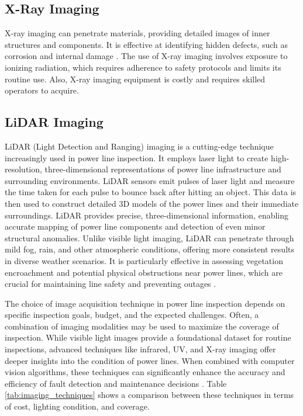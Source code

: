 \subsection{X-Ray Imaging}
X-ray imaging can penetrate materials, providing detailed images of inner structures and components. It is effective at identifying hidden defects, such as corrosion and internal damage \cite{wang_internal_2023}. The use of X-ray imaging involves exposure to ionizing radiation, which requires adherence to safety protocols and limits its routine use. Also, X-ray imaging equipment is costly and requires skilled operators to acquire.

\subsection{LiDAR Imaging}
LiDAR (Light Detection and Ranging) imaging is a cutting-edge technique increasingly used in power line inspection. It employs laser light to create high-resolution, three-dimensional representations of power line infrastructure and surrounding environments. LiDAR sensors emit pulses of laser light and measure the time taken for each pulse to bounce back after hitting an object. This data is then used to construct detailed 3D models of the power lines and their immediate surroundings. LiDAR provides precise, three-dimensional information, enabling accurate mapping of power line components and detection of even minor structural anomalies. Unlike visible light imaging, LiDAR can penetrate through mild fog, rain, and other atmospheric conditions, offering more consistent results in diverse weather scenarios. It is particularly effective in assessing vegetation encroachment and potential physical obstructions near power lines, which are crucial for maintaining line safety and preventing outages \cite{guan2021uav, bergmann2024approach}.

The choice of image acquisition technique in power line inspection depends on specific inspection goals, budget, and the expected challenges. Often, a combination of imaging modalities may be used to maximize the coverage of inspection. While visible light images provide a foundational dataset for routine inspections, advanced techniques like infrared, UV, and X-ray imaging offer deeper insights into the condition of power lines. When combined with computer vision algorithms, these techniques can significantly enhance the accuracy and efficiency of fault detection and maintenance decisions \cite{li_image_2019}. Table \ref{tab:imaging_techniques} shows a comparison between these techniques in terms of cost, lighting condition, and coverage.


